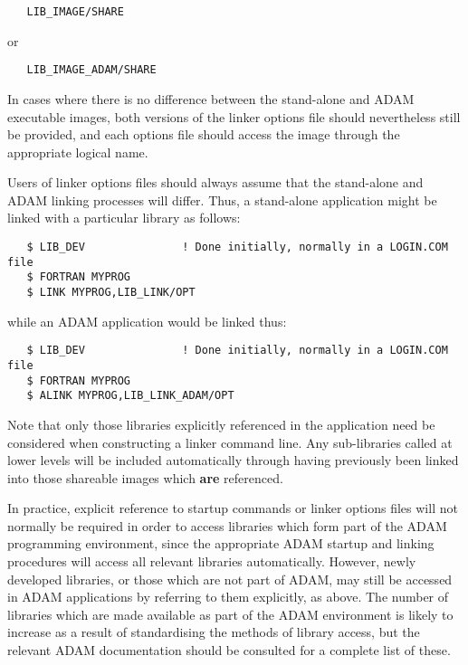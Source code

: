 \begin{verbatim}
   LIB_IMAGE/SHARE
\end{verbatim}

or

\begin{verbatim}
   LIB_IMAGE_ADAM/SHARE
\end{verbatim}

In cases where there is no difference between the stand-alone and ADAM
executable images, both versions of the linker options file should
nevertheless still be provided, and each options file should access the
image through the appropriate logical name. 

Users of linker options files should always assume that the stand-alone and
ADAM linking processes will differ.
Thus, a stand-alone application might be linked with a particular library as
follows: 

\begin{verbatim}
   $ LIB_DEV               ! Done initially, normally in a LOGIN.COM file
   $ FORTRAN MYPROG
   $ LINK MYPROG,LIB_LINK/OPT
\end{verbatim}

while an ADAM application would be linked thus:

\begin{verbatim}
   $ LIB_DEV               ! Done initially, normally in a LOGIN.COM file
   $ FORTRAN MYPROG
   $ ALINK MYPROG,LIB_LINK_ADAM/OPT
\end{verbatim}

Note that only those libraries explicitly referenced in the application need 
be considered when constructing a linker command line.
Any sub-libraries called at lower levels will be included automatically
through having previously been linked into those shareable images which {\bf
are} referenced. 

In practice, explicit reference to startup commands or linker options files
will not normally be required in order to access libraries which form part
of the ADAM programming environment, since the appropriate ADAM startup and
linking procedures will access all relevant libraries automatically. 
However, newly developed libraries, or those which are not part of ADAM, may
still be accessed in ADAM applications by referring to them explicitly, as
above.
The number of libraries which are made available as part of the ADAM
environment is likely to increase as a result of standardising the methods
of library access, but the relevant ADAM documentation should be consulted
for a complete list of these. 

